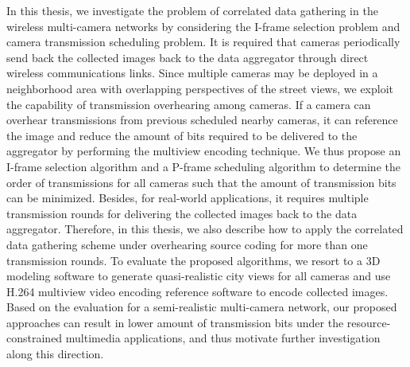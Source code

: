 In this thesis, we investigate the problem of correlated data gathering in the wireless multi-camera networks by considering the I-frame selection problem and camera transmission scheduling problem.
It is required that cameras periodically send back the collected images back to the data aggregator through direct wireless communications links.
Since multiple cameras may be deployed in a neighborhood area with overlapping perspectives of the street views, we exploit the capability of transmission overhearing among cameras.
If a camera can overhear transmissions from previous scheduled nearby cameras, it can reference the image and reduce the amount of bits required to be delivered to the aggregator by performing the multiview encoding technique.
We thus propose an I-frame selection algorithm and a P-frame scheduling algorithm to determine the order of transmissions for all cameras such that the amount of transmission bits can be minimized.
Besides, for real-world applications, it requires multiple transmission rounds for delivering the collected images back to the data aggregator.
Therefore, in this thesis, we also describe how to apply the correlated data gathering scheme under overhearing source coding for more than one transmission rounds.
To evaluate the proposed algorithms, we resort to a 3D modeling software to generate quasi-realistic city views for all cameras and use H.264 multiview video encoding reference software to encode collected images.
Based on the evaluation for a semi-realistic multi-camera network, our proposed approaches can result in lower amount of transmission bits under the resource-constrained multimedia applications, and thus motivate further investigation along this direction.
